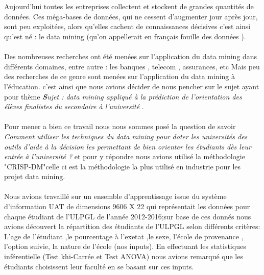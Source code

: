 \makeatletter
\renewenvironment{abstract}{%
	\if@twocolumn
	\section*{\abstractname}%
	\else %
	\begin{center}%
		{\bfseries\Large\textit {\abstractname}\vspace{\z@}}%
	\end{center}%
	\quotation
	\fi}
{\if@twocolumn\else\endquotation\fi}
\makeatother
{} 
\begin{abstract}
	\thispagestyle{plain} 
Aujourd'hui toutes les entreprises collectent et stockent de grandes quantités de données. Ces méga-bases de données, qui ne cessent d'augmenter jour après jour, sont peu exploitées, alors qu'elles cachent de connaissances décisives c'est ainsi qu'est né : le data mining   (qu'on appellerait en français fouille des données ).
\paragraph{}
Des nombreuses recherches ont été menées sur l'application du data mining dans différents domaines,  entre autre : les banques , telecom , assurances, etc
Mais peu des recherches de ce genre sont menées sur l'application du data mining à l'éducation. c'est ainsi que nous avions décider 
de nous pencher sur le sujet ayant pour thème \textit{ \textbf Sujet : data mining appliqué à la prédiction de l'orientation des élèves finalistes du secondaire à l'université } .
\paragraph{}
Pour mener a bien ce travail nous nous sommes posé la question de savoir \emph{Comment utiliser les techniques  du data mining pour doter les universités des outils d'aide à la décision les permettant de bien orienter les étudiants dès leur entrée à l'université ?  } et pour y répondre nous avions utilisé la méthodologie "\ac{CRISP-DM}"celle ci est la méthodologie la plus utilisé en industrie pour les projet data mining.
\paragraph{}
Nous avions travaillé sur un ensemble d'apprentissage issue du système d'information UAT de dimensions 9606 X 22 qui représentait les données pour chaque étudiant de l'ULPGL de l'année 2012-2016;sur base de ces donnés nous avions découvert la répartition des étudiants de l'ULPGL selon différents critères:  L'age de l'étudiant ,le pourcentage à l'exetat ,le sexe, l'école de provenance , l'option suivie, la nature de l'école  (nos inputs). 
En effectuant les statistiques inférentielle (Test khi-Carrée et Test ANOVA) nous avions remarqué que les étudiants choisissent leur faculté  en se basant sur ces inputs.

\end{abstract}
